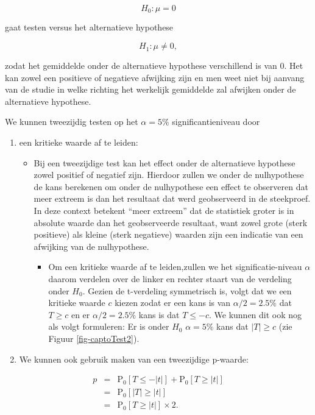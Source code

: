 \documentclass[
  dutch,
  letterpaper,
  12pt]{book}
\providecommand{\tightlist}{%
  \setlength{\itemsep}{0pt}\setlength{\parskip}{0pt}}
\theoremstyle{definition}
\theoremstyle{definition}
\theoremstyle{definition}
\theoremstyle{remark}
\begin{document}
\[H_0: \mu=0\]

gaat testen versus het alternatieve hypothese

\[H_1: \mu\neq0,\]

zodat het gemiddelde onder de alternatieve hypothese verschillend is van
\(0\). Het kan zowel een positieve of negatieve afwijking zijn en men
weet niet bij aanvang van de studie in welke richting het werkelijk
gemiddelde zal afwijken onder de alternatieve hypothese.

We kunnen tweezijdig testen op het \(\alpha=5\%\) significantieniveau
door

\begin{enumerate}
\def\labelenumi{\arabic{enumi}.}
\tightlist
\item
  een kritieke waarde af te leiden:

  \begin{itemize}
  \tightlist
  \item
    Bij een tweezijdige test kan het effect onder de alternatieve
    hypothese zowel positief of negatief zijn. Hierdoor zullen we onder
    de nulhypothese de kans berekenen om onder de nulhypothese een
    effect te observeren dat meer extreem is dan het resultaat dat werd
    geobserveerd in de steekproef. In deze context betekent ``meer
    extreem'' dat de statistiek groter is in absolute waarde dan het
    geobserveerde resultaat, want zowel grote (sterk positieve) als
    kleine (sterk negatieve) waarden zijn een indicatie van een
    afwijking van de nulhypothese.

    \begin{itemize}
    \tightlist
    \item
      Om een kritieke waarde af te leiden,zullen we het
      significatie-niveau \(\alpha\) daarom verdelen over de linker en
      rechter staart van de verdeling onder \(H_0\). Gezien de
      t-verdeling symmetrisch is, volgt dat we een kritieke waarde \(c\)
      kiezen zodat er een kans is van \(\alpha/2=2.5\%\) dat \(T\geq c\)
      en er \(\alpha/2=2.5\%\) kans is dat \(T\leq -c\). We kunnen dit
      ook nog als volgt formuleren: Er is onder \(H_0\) \(\alpha=5\%\)
      kans dat \(\vert T\vert\geq c\) (zie Figuur \ref{fig-captoTest2}).
    \end{itemize}
  \end{itemize}
\item
  We kunnen ook gebruik maken van een tweezijdige p-waarde:
\end{enumerate}

\begin{eqnarray*}
  p&=&\text{P}_0\left[T\leq -|t|\right] + \text{P}_0\left[T\geq |t|\right]\\
  &=&\text{P}_0\left[\vert T\vert \geq \vert t \vert\right]\\
  &=&\text{P}_0\left[T \geq \vert t \vert\right]\times 2.
\end{eqnarray*}
\end{document}
